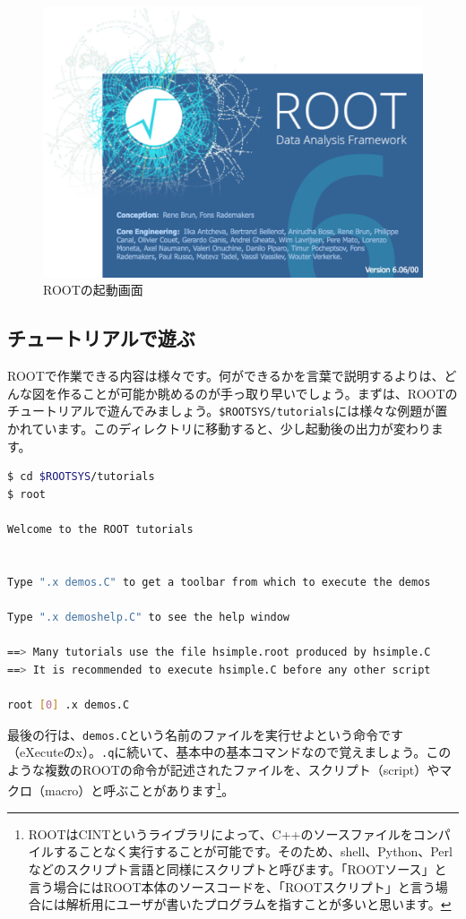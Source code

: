\begin{figure}
  \centering
  \includegraphics[width=12cm,bb= 0 0 1188 846]{fig/splash6.png}
  \caption{ROOTの起動画面}
  \label{fig_splash}
\end{figure}

\subsection{チュートリアルで遊ぶ}
\label{subsec_tutorial}
ROOTで作業できる内容は様々です。何ができるかを言葉で説明するよりは、どんな図を作ることが可能か眺めるのが手っ取り早いでしょう。まずは、ROOTのチュートリアルで遊んでみましょう。\texttt{\$ROOTSYS/tutorials}には様々な例題が置かれています。このディレクトリに移動すると、少し起動後の出力が変わります。
\begin{lstlisting}[language=bash]
$ cd $ROOTSYS/tutorials
$ root

Welcome to the ROOT tutorials


Type ".x demos.C" to get a toolbar from which to execute the demos

Type ".x demoshelp.C" to see the help window

==> Many tutorials use the file hsimple.root produced by hsimple.C
==> It is recommended to execute hsimple.C before any other script

root [0] .x demos.C
\end{lstlisting}
最後の行は、\texttt{demos.C}という名前のファイルを実行せよという命令です（eXecuteのx）。\texttt{.q}に続いて、基本中の基本コマンドなので覚えましょう。このような複数のROOTの命令が記述されたファイルを、スクリプト（script）やマクロ（macro）と呼ぶことがあります\footnote{ROOTはCINTというライブラリによって、C++のソースファイルをコンパイルすることなく実行することが可能です。そのため、shell、Python、Perlなどのスクリプト言語と同様にスクリプトと呼びます。「ROOTソース」と言う場合にはROOT本体のソースコードを、「ROOTスクリプト」と言う場合には解析用にユーザが書いたプログラムを指すことが多いと思います。}。

